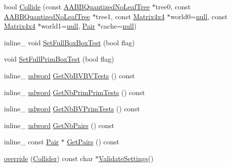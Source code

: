 \begin{DoxyCompactItemize}
\item 
bool \hyperlink{classOpcode_1_1AABBTreeCollider_ad5829608c064e19c01191c1e336ac89c}{Collide} (const \hyperlink{classOpcode_1_1AABBQuantizedNoLeafTree}{A\+A\+B\+B\+Quantized\+No\+Leaf\+Tree} $\ast$tree0, const \hyperlink{classOpcode_1_1AABBQuantizedNoLeafTree}{A\+A\+B\+B\+Quantized\+No\+Leaf\+Tree} $\ast$tree1, const \hyperlink{classOpcode_1_1Matrix4x4}{Matrix4x4} $\ast$world0=\hyperlink{IceTypes_8h_ac97b8ee753e4405397a42ad5799b0f9e}{null}, const \hyperlink{classOpcode_1_1Matrix4x4}{Matrix4x4} $\ast$world1=\hyperlink{IceTypes_8h_ac97b8ee753e4405397a42ad5799b0f9e}{null}, \hyperlink{structPair}{Pair} $\ast$cache=\hyperlink{IceTypes_8h_ac97b8ee753e4405397a42ad5799b0f9e}{null})
\item 
inline\+\_\+ void \hyperlink{classOpcode_1_1AABBTreeCollider_abef9bda9e0707afbddc99d21172efb22}{Set\+Full\+Box\+Box\+Test} (bool flag)
\item 
void \hyperlink{classOpcode_1_1AABBTreeCollider_a875259c590d9330ffa1003fea1b8217d}{Set\+Full\+Prim\+Box\+Test} (bool flag)
\item 
inline\+\_\+ \hyperlink{IceTypes_8h_a44c6f1920ba5551225fb534f9d1a1733}{udword} \hyperlink{classOpcode_1_1AABBTreeCollider_afd130b0a89dc111fd0220dc392d60c06}{Get\+Nb\+B\+V\+B\+V\+Tests} () const 
\item 
inline\+\_\+ \hyperlink{IceTypes_8h_a44c6f1920ba5551225fb534f9d1a1733}{udword} \hyperlink{classOpcode_1_1AABBTreeCollider_a12f6ef206ef9b992e8f69c9563e76112}{Get\+Nb\+Prim\+Prim\+Tests} () const 
\item 
inline\+\_\+ \hyperlink{IceTypes_8h_a44c6f1920ba5551225fb534f9d1a1733}{udword} \hyperlink{classOpcode_1_1AABBTreeCollider_aca8efbad55faa3335b1acb5c0673ad46}{Get\+Nb\+B\+V\+Prim\+Tests} () const 
\item 
inline\+\_\+ \hyperlink{IceTypes_8h_a44c6f1920ba5551225fb534f9d1a1733}{udword} \hyperlink{classOpcode_1_1AABBTreeCollider_a7383c38102befb48167f908b689a7f17}{Get\+Nb\+Pairs} () const 
\item 
inline\+\_\+ const \hyperlink{structPair}{Pair} $\ast$ \hyperlink{classOpcode_1_1AABBTreeCollider_a3929ec25cc5058552676fc5e634b8c77}{Get\+Pairs} () const 
\item 
\hyperlink{classOpcode_1_1AABBTreeCollider_a5a1580d6f874fc70c8114b68d1730714}{override} (\hyperlink{classOpcode_1_1Collider}{Collider}) const char $\ast$\hyperlink{classOpcode_1_1Collider_a9099aa79f7b57fe4018f37e967cc6be5}{Validate\+Settings}()
\end{DoxyCompactItemize}
